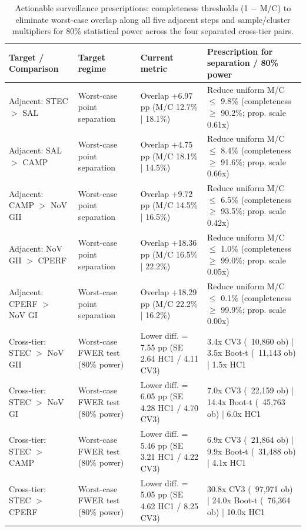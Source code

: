 \begin{table}[!tbp]
\centering
\tiny
\setlength{\tabcolsep}{1.8pt}
\renewcommand{\arraystretch}{1.12}
\caption{Actionable surveillance prescriptions: completeness thresholds (1 $-$ M/C) to eliminate worst-case overlap along all five adjacent steps and sample/cluster multipliers for 80\% statistical power across the four separated cross-tier pairs.}
\label{tab:prescriptions}
\begin{tabular}{>{\raggedright\arraybackslash}p{2.8cm}>{\raggedright\arraybackslash}p{2.4cm}>{\raggedright\arraybackslash}p{4.15cm}>{\raggedright\arraybackslash}p{5.15cm}}
\toprule
Target / Comparison & Target regime & Current metric & Prescription for separation / 80\% power \\
\midrule
Adjacent: STEC $>$ SAL & Worst-case point separation & Overlap +6.97 pp (M/C 12.7\% | 18.1\%) & Reduce uniform M/C $\leq$ 9.8\% (completeness $\geq$ 90.2\%; prop. scale 0.61x) \\
Adjacent: SAL $>$ CAMP & Worst-case point separation & Overlap +4.75 pp (M/C 18.1\% | 14.5\%) & Reduce uniform M/C $\leq$ 8.4\% (completeness $\geq$ 91.6\%; prop. scale 0.66x) \\
Adjacent: CAMP $>$ NoV GII & Worst-case point separation & Overlap +9.72 pp (M/C 14.5\% | 16.5\%) & Reduce uniform M/C $\leq$ 6.5\% (completeness $\geq$ 93.5\%; prop. scale 0.42x) \\
Adjacent: NoV GII $>$ CPERF & Worst-case point separation & Overlap +18.36 pp (M/C 16.5\% | 22.2\%) & Reduce uniform M/C $\leq$ 1.0\% (completeness $\geq$ 99.0\%; prop. scale 0.05x) \\
Adjacent: CPERF $>$ NoV GI & Worst-case point separation & Overlap +18.29 pp (M/C 22.2\% | 16.2\%) & Reduce uniform M/C $\leq$ 0.1\% (completeness $\geq$ 99.9\%; prop. scale 0.00x) \\
Cross-tier: STEC $>$ NoV GII & Worst-case FWER test (80\% power) & Lower diff. = 7.55 pp (SE 2.64 HC1 / 4.11 CV3) & 3.4x CV3 (~10,860 ob) | 3.5x Boot-t (~11,143 ob) | 1.5x HC1 \\
Cross-tier: STEC $>$ NoV GI & Worst-case FWER test (80\% power) & Lower diff. = 6.05 pp (SE 4.28 HC1 / 4.70 CV3) & 7.0x CV3 (~22,159 ob) | 14.4x Boot-t (~45,763 ob) | 6.0x HC1 \\
Cross-tier: STEC $>$ CAMP & Worst-case FWER test (80\% power) & Lower diff. = 5.46 pp (SE 3.21 HC1 / 4.22 CV3) & 6.9x CV3 (~21,864 ob) | 9.9x Boot-t (~31,488 ob) | 4.1x HC1 \\
Cross-tier: STEC $>$ CPERF & Worst-case FWER test (80\% power) & Lower diff. = 5.05 pp (SE 4.62 HC1 / 8.25 CV3) & 30.8x CV3 (~97,971 ob) | 24.0x Boot-t (~76,364 ob) | 10.0x HC1 \\

\end{tabular}
\end{table}
